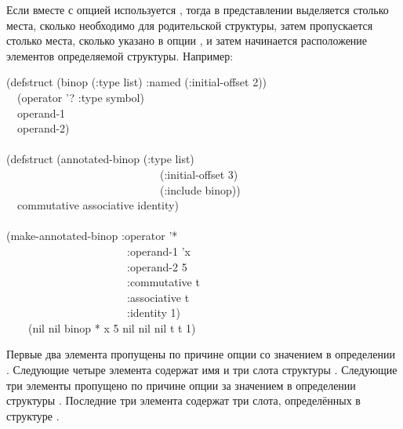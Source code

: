 Если вместе с опцией  используется , тогда в
представлении выделяется столько места, сколько необходимо для родительской
структуры, затем пропускается столько места, сколько указано в опции
, и затем начинается расположение элементов определяемой
структуры.
Например:
\begin{lisp}
(defstruct (binop (:type list) :named (:initial-offset 2)) \\
~~(operator '? :type symbol) \\
~~operand-1 \\
~~operand-2) \\
 \\
(defstruct (annotated-binop (:type list) \\
~~~~~~~~~~~~~~~~~~~~~~~~~~~~(:initial-offset 3) \\
~~~~~~~~~~~~~~~~~~~~~~~~~~~~(:include binop)) \\
~~commutative associative identity) \\
 \\
(make-annotated-binop :operator '* \\
~~~~~~~~~~~~~~~~~~~~~~:operand-1 'x \\
~~~~~~~~~~~~~~~~~~~~~~:operand-2 5 \\
~~~~~~~~~~~~~~~~~~~~~~:commutative t \\
~~~~~~~~~~~~~~~~~~~~~~:associative t \\
~~~~~~~~~~~~~~~~~~~~~~:identity 1) \\
~~~\EV\ (nil nil binop * x 5 nil nil nil t t 1)
\end{lisp}
Первые два {\nil} элемента пропущены по причине опции  со значением
 в определении . Следующие четыре элемента содержат имя и три слота
структуры . Следующие три {\nil} элементы пропущено по причине опции
 за значением  в определении структуры
. Последние три элемента содержат три слота, определённых в
структуре .


\fi